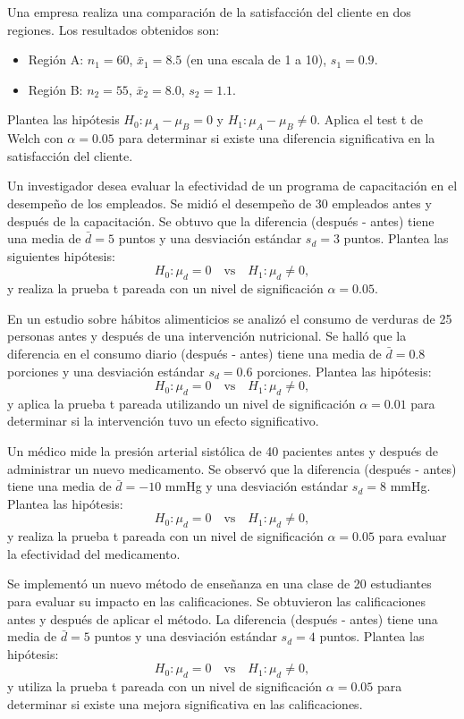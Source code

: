 \documentclass[addpoints,12pt]{exam}
\theoremstyle{plain}
\theoremstyle{remark}
\theoremstyle{definition}
\begin{document}
\begin{questions}
 \question  Una empresa realiza una comparación de la satisfacción del cliente en dos regiones. Los resultados obtenidos son:
    \begin{itemize}
        \item Región A: \( n_1 = 60 \), \(\bar{x}_1 = 8.5\) (en una escala de 1 a 10), \( s_1 = 0.9 \).
        \item Región B: \( n_2 = 55 \), \(\bar{x}_2 = 8.0\), \( s_2 = 1.1 \).
    \end{itemize}
    Plantea las hipótesis \(H_0: \mu_A - \mu_B = 0\) y \(H_1: \mu_A - \mu_B \neq 0\). Aplica el test t de Welch con \(\alpha = 0.05\) para determinar si existe una diferencia significativa en la satisfacción del cliente.

 \question   Un investigador desea evaluar la efectividad de un programa de capacitación en el desempeño de los empleados. Se midió el desempeño de 30 empleados antes y después de la capacitación. Se obtuvo que la diferencia (después - antes) tiene una media de \(\bar{d} = 5\) puntos y una desviación estándar \(s_d = 3\) puntos. Plantea las siguientes hipótesis:
    \[
    H_0: \mu_d = 0 \quad \text{vs} \quad H_1: \mu_d \neq 0,
    \]
    y realiza la prueba t pareada con un nivel de significación \(\alpha = 0.05\).

 \question  En un estudio sobre hábitos alimenticios se analizó el consumo de verduras de 25 personas antes y después de una intervención nutricional. Se halló que la diferencia en el consumo diario (después - antes) tiene una media de \(\bar{d} = 0.8\) porciones y una desviación estándar \(s_d = 0.6\) porciones. Plantea las hipótesis:
    \[
    H_0: \mu_d = 0 \quad \text{vs} \quad H_1: \mu_d \neq 0,
    \]
    y aplica la prueba t pareada utilizando un nivel de significación \(\alpha = 0.01\) para determinar si la intervención tuvo un efecto significativo.

 \question   Un médico mide la presión arterial sistólica de 40 pacientes antes y después de administrar un nuevo medicamento. Se observó que la diferencia (después - antes) tiene una media de \(\bar{d} = -10\) mmHg y una desviación estándar \(s_d = 8\) mmHg. Plantea las hipótesis:
    \[
    H_0: \mu_d = 0 \quad \text{vs} \quad H_1: \mu_d \neq 0,
    \]
    y realiza la prueba t pareada con un nivel de significación \(\alpha = 0.05\) para evaluar la efectividad del medicamento.

 \question  Se implementó un nuevo método de enseñanza en una clase de 20 estudiantes para evaluar su impacto en las calificaciones. Se obtuvieron las calificaciones antes y después de aplicar el método. La diferencia (después - antes) tiene una media de \(\bar{d} = 5\) puntos y una desviación estándar \(s_d = 4\) puntos. Plantea las hipótesis:
    \[
    H_0: \mu_d = 0 \quad \text{vs} \quad H_1: \mu_d \neq 0,
    \]
    y utiliza la prueba t pareada con un nivel de significación \(\alpha = 0.05\) para determinar si existe una mejora significativa en las calificaciones.






\end{questions}
\end{document}
